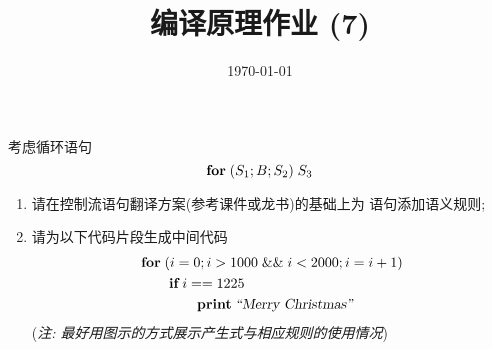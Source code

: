 \documentclass[a4paper, justified]{tufte-handout}
\title{编译原理作业 (7)}
\date{\today}
\begin{document}
\maketitle
\noplagiarism %
\begin{abstract}
\end{abstract}
\beginrequired

\begin{problem}[\score{10 = 5 + 5}]
  考虑循环语句
  \[
    \text{\bf for} \;(S_{1}; B; S_{2})\; S_{3}
  \]
  \begin{enumerate}[(1)]
    \item 请在控制流语句翻译方案(参考课件或龙书)的基础上为 \forkw{} 语句添加语义规则;
    \item 请为以下代码片段生成中间代码
      \begin{align*}
        &\text{\bf for}\; (i = 0; i > 1000 \;\&\&\; i < 2000; i = i + 1) \\
          &\qquad \text{\bf if}\; i == 1225\; \\
          &\qquad\qquad \text{\bf print}\; {\textsl{``Merry Christmas''}}
      \end{align*}
      ({\it 注: 最好用图示的方式展示产生式与相应规则的使用情况})
  \end{enumerate}
\end{problem}
\end{document}
